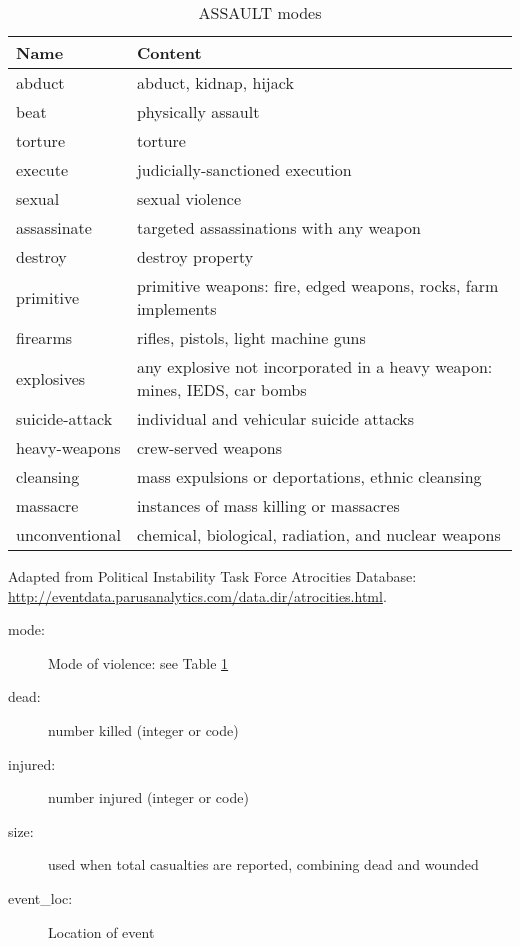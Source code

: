 \documentclass[11pt]{report}
\begin{document}
\begin{table}[htp]
\caption{ASSAULT modes}
\begin{center}
\begin{tabular}{|l|l|}
\hline
Name & Content \\
\hline
abduct & abduct, kidnap, hijack \\
beat & physically assault \\
torture & torture \\
execute & judicially-sanctioned execution\\
sexual & sexual violence\\
assassinate & targeted assassinations with any weapon \\
destroy & destroy property \\
primitive & primitive weapons: fire, edged weapons, rocks, farm implements \\
firearms & rifles, pistols, light machine guns\\
explosives & any explosive not incorporated in a heavy weapon: mines, IEDS, car bombs \\
suicide-attack & individual and vehicular suicide attacks \\
heavy-weapons & crew-served weapons  \\
cleansing & mass expulsions or deportations, ethnic cleansing  \\
massacre & instances of mass killing or massacres  \\
unconventional & chemical, biological, radiation, and nuclear weapons  \\
\hline
\end{tabular}
\end{center}
\label{tab:violmode}
\raggedright{Adapted from Political Instability Task Force Atrocities Database: \url{http://eventdata.parusanalytics.com/data.dir/atrocities.html}}. 
\end{table}%

\begin{description}
	\item[mode:] Mode of violence: see Table \ref{tab:violmode} 
	\item[dead:]  number killed (integer or code) 
	\item[injured:] number injured (integer or code) 
	\item[size:] used when total casualties are reported, combining dead and wounded 
	\item[event\_loc:] Location of event 
\end{description}
\end{document}
